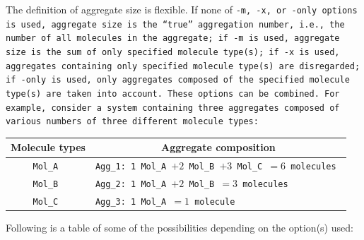 The definition of aggregate size is flexible. If none of \tt{-m}, \tt{-x}, or
\tt{-only} options is used, aggregate size is the \enquote{true} aggregation
number, i.e., the number of all molecules in the aggregate; if \tt{-m} is used,
aggregate size is the sum of only specified molecule type(s); if \tt{-x} is
used, aggregates containing only specified molecule type(s) are disregarded; if
\tt{-only} is used, only aggregates composed of the specified molecule type(s)
are taken into account. These options can be combined. For example, consider a
system containing three aggregates composed of various numbers of three
different molecule types:
\vspace{-0.5em}
\begin{longtable}{c|l}
  \toprule
  Molecule types & \multicolumn{1}{c}{Aggregate composition} \\
  \midrule
  \tt{Mol_A} & \tt{Agg_1}: 1 \tt{Mol_A} $+2$ \tt{Mol_B} $+3$ \tt{Mol_C} $=6$ molecules \\
  \tt{Mol_B} & \tt{Agg_2}: 1 \tt{Mol_A} $+2$ \tt{Mol_B} $=3$ molecules \\
  \tt{Mol_C} & \tt{Agg_3}: 1 \tt{Mol_A} $=1$ molecule \\
  \bottomrule
\end{longtable}
\vspace{-0.5em}\noindent
Following is a table of some of the possibilities depending on the option(s)
used:
\vspace{-0.5em}
